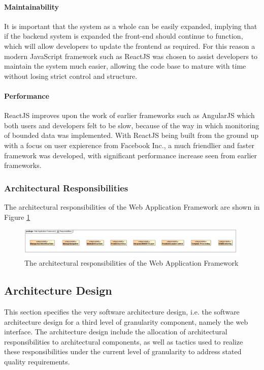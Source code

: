 \paragraph{Maintainability}
It is important that the system as a whole can be easily expanded, implying
that if the backend system is expanded the front-end should continue to function,
which will allow developers to update the frontend as required. For this reason
a modern JavaScript framework such as ReactJS was chosen to assist developers 
to maintain the system much easier, allowing the code base to mature with time
without losing strict control and structure.

\paragraph{Performance}
ReactJS improves upon the work of earlier frameworks such as AngularJS which both
users and developers felt to be slow, because of the way in which monitoring of
bounded data was implemented. With ReactJS being built from the ground up with a
focus on user expierence from Facebook Inc., a much friendlier and faster framework
was developed, with significant performance increase seen from earlier frameworks.

	
\subsubsection{Architectural Responsibilities}
The architectural responsibilities of the Web Application Framework are shown in 
Figure \ref{fig:webApplicationFrameworkResponsibilities}
\begin{figure}[H]
	\begin{center}
	\includegraphics[scale=0.35]{../Diagrams and Charts/Web Application Framework/Responsibilities.jpg}
	\caption{The architectural responsibilities of the Web Application Framework}
	\label{fig:webApplicationFrameworkResponsibilities}
	\end{center}
\end{figure}

\subsection{Architecture Design}
This section specifies the very software architecture design, i.e.
the software architecture design for a third level of granularity component, namely
the web interface. The architecture design include the allocation of architectural
responsibilities to architectural components, as well as tactics used to realize these
responsibilities under the  current level of granularity to address stated
quality requirements.

